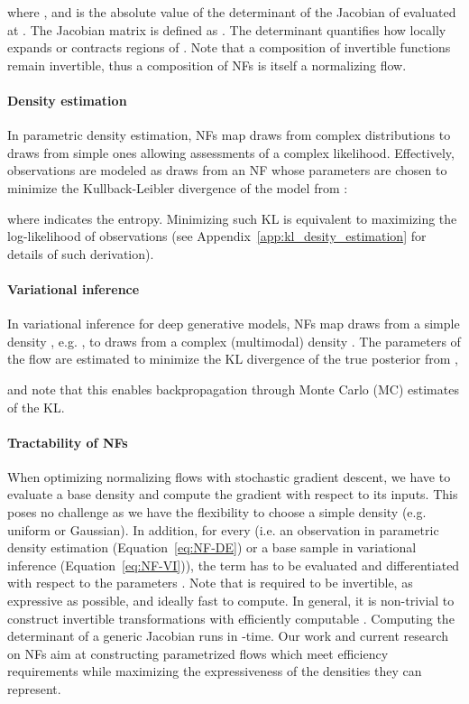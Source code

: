 \documentclass[letterpaper]{article}
\begin{document}
where , and  is the absolute value of the determinant of the Jacobian of  evaluated at . The Jacobian matrix is defined as . The determinant quantifies how  locally expands or contracts regions of . Note that a composition of invertible functions remain invertible, thus a composition of NFs is itself a normalizing flow. 

\paragraph{Density estimation} 
In parametric density estimation, NFs map draws from complex distributions to draws from simple ones allowing assessments of a complex likelihood. Effectively, observations  are modeled as draws from an NF  whose parameters  are chosen to minimize the Kullback-Leibler divergence  of the model  from : 

where  indicates the entropy. Minimizing such KL is equivalent to maximizing the log-likelihood of observations (see Appendix~\ref{app:kl_desity_estimation} for details of such derivation).

\paragraph{Variational inference} 
In variational inference for deep generative models, NFs map draws from a simple density , e.g. , to draws from a complex (multimodal) density . The parameters  of the flow are estimated to minimize the KL divergence  of the true posterior  from , 

and note that this enables backpropagation through Monte Carlo (MC) estimates of the KL.

\paragraph{Tractability of NFs}
When optimizing normalizing flows with stochastic gradient descent, we have to evaluate a base density and compute the gradient with respect to its inputs. This poses no challenge as we have the flexibility to choose a simple density (e.g. uniform or Gaussian). In addition, for every  (i.e. an observation in parametric density estimation (Equation~\ref{eq:NF-DE}) or a base sample in variational inference (Equation~\ref{eq:NF-VI})), the term  has to be evaluated and differentiated with respect to the parameters . Note that  is required to be invertible, as expressive as possible, and ideally fast to compute. In general, it is non-trivial to construct invertible transformations with efficiently computable . Computing the determinant of a generic Jacobian  runs in -time. 
Our work and current research on NFs aim at constructing parametrized flows which meet efficiency requirements while maximizing the expressiveness of the densities they can represent.
\end{document}

